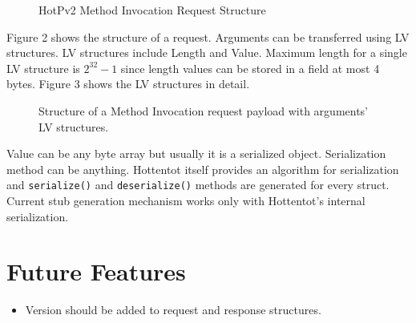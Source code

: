\documentclass[10pt,a4paper]{article}
\begin{document}
\begin{figure}[!ht]
  \caption{HotPv2 Method Invocation Request Structure}
  \centering
\end{figure}

Figure 2 shows the structure of a request. Arguments can be transferred using LV structures. LV structures include Length and Value. Maximum length for a single LV structure is $2^{32} - 1$ since length values can be stored in a field at most 4 bytes. Figure 3 shows the LV structures in detail.

\begin{figure}[!ht]
  \caption{Structure of a Method Invocation request payload with arguments' LV structures.}
  \centering
\end{figure}

Value can be any byte array but usually it is a serialized object. Serialization method can be anything. Hottentot itself provides an algorithm for serialization and \texttt {serialize()} and \texttt {deserialize()} methods are generated for every struct. Current stub generation mechanism works only with Hottentot's internal serialization.

\section {Future Features}
\begin{itemize}
  \item Version should be added to request and response structures.
\end{itemize}
\end{document}
